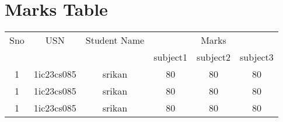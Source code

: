 \documentclass[a4paper,12pt]{article}
\begin{document}
\section*{Marks Table}
\begin{tabular}{|c|c|c|c|c|c|}
\hline
Sno & USN & Student Name & \multicolumn{3}{c|}{Marks} \\
\cline{4-6}
& & & subject1 & subject2 & subject3 \\
\hline
1 & 1ic23cs085 & srikan & 80 & 80 & 80 \\
\hline
1 & 1ic23cs085 & srikan & 80 & 80 & 80 \\
\hline
1 & 1ic23cs085 & srikan & 80 & 80 & 80 \\
\hline
\end{tabular}
\end{document}

